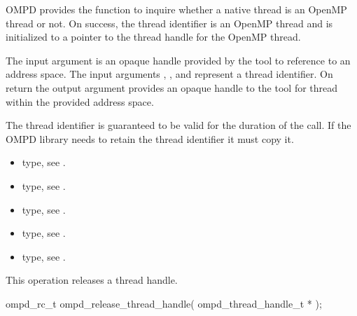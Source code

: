 \descr
OMPD provides the function 
to inquire whether a native thread is an OpenMP
thread or not.
On success, the thread identifier is an OpenMP thread and 
is initialized to a pointer to the thread handle for the OpenMP thread.

\argdesc


The input argument  is an opaque handle provided by the tool
to reference to an address space.
The input arguments ,  , and  represent a
thread identifier.
On return the output argument  provides an opaque handle to the
tool for thread within the provided address space.

The thread identifier  is guaranteed to be valid for the duration of the call. If the
OMPD library needs to retain the thread identifier it must copy it.





\crossreferences
\begin{itemize}
  \item {} type, see .
	\item {} type, see .
	\item {} type, see .
	\item {} type, see .
	\item {} type, see .
\end{itemize}

\label{subsubsubsec:ompd_release_thread_handle}
\summary
This operation releases a thread handle.

\format

\begin{cspecific}
\begin{ompSyntax}
ompd_rc_t ompd_release_thread_handle(
  ompd_thread_handle_t *
);
\end{ompSyntax}
\end{cspecific}


